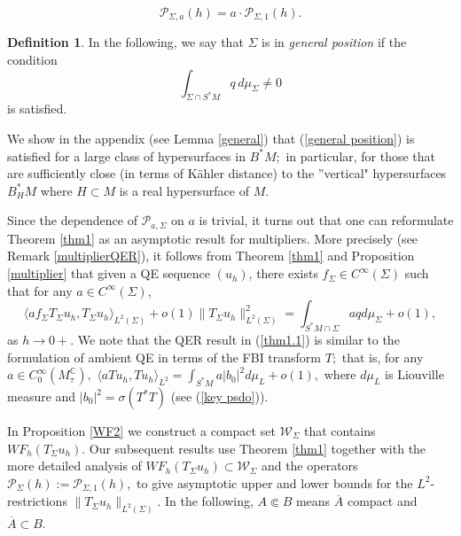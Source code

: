 \documentclass[11pt,reqno]{amsart}
\newcommand{\C}{{\mathbb C}}
\theoremstyle{definition}
\newtheorem{definition}{Definition}
\begin{document}
\begin{equation} \label{basic op}
{\mathcal P}_{\Sigma,a}(h) = a \cdot {\mathcal P}_{\Sigma,1}(h).
\end{equation}

\begin{definition} In the following, we say that $\Sigma$ is in {\em general position} if the condition
\begin{equation} \label{general position}
\int_{\Sigma \cap S^*M} q \, d\mu_{\Sigma} \neq 0
\end{equation}
is satisfied.
\end{definition}

We show in the appendix (see Lemma \ref{general}) that (\ref{general position}) is satisfied for a large class of hypersurfaces in $B^*M;$ in particular, for those that are sufficiently close (in terms of K\"{a}hler distance) to the ''vertical" hypersurfaces $B_H^*M$ where $H \subset M$ is a real hypersurface of $M$.

Since the dependence of ${\mathcal P}_{a,\Sigma}$ on $a$ is trivial, it turns out that one can reformulate Theorem \ref{thm1} as an asymptotic result for multipliers.  More precisely (see Remark \ref{multiplierQER}), it follows from Theorem \ref{thm1} and Proposition \ref{multiplier} that  given a QE sequence $(u_h)$,  there exists  $f_{\Sigma} \in C^{\infty}(\Sigma)$ such that for any $a \in C^{\infty}(\Sigma)$,
\begin{equation} \label{thm1.1}
\langle a  f_{\Sigma} T_{\Sigma} u_h, T_{\Sigma} u_h \rangle_{L^2(\Sigma)}  + o(1) \| T_\Sigma u_h \|^2_{L^2(\Sigma)} = \int_{S^*M \cap \Sigma} a q d\mu_{\Sigma} + o(1),
\end{equation}
as $h \to 0+.$
We note that  the QER result in (\ref{thm1.1}) is  similar to  the formulation of  ambient QE in terms of the FBI transform $T;$  that is, for any  $a \in C^{\infty}_0(M^{\C}_\tau),$
$\langle a Tu_h, Tu_h \rangle_{L^2} = \int_{S^*M} a  |b_0|^2 d\mu_L +o(1),$  where $d\mu_L$ is Liouville measure and $ |b_0|^2= \sigma(T^*T)$ (see (\ref{key psdo})).  



In Proposition \ref{WF2} we construct a compact set $\mathcal{W}_{\Sigma}$ that contains $WF_h(T_{\Sigma}u_h)$. Our subsequent results use Theorem \ref{thm1} together with the more detailed analysis of $WF_h(T_{\Sigma} u_h)\subset\mathcal{W}_{\Sigma}$ and the operators ${\mathcal P}_{\Sigma}(h):= {\mathcal P}_{\Sigma, 1}(h),$ to give asymptotic upper and lower bounds for the $L^2$-restrictions $\|T_{\Sigma} u_h \|_{L^2(\Sigma)}$. In the following, $A\Subset B$ means $\overline{A}$ compact and $\overline A\subset B$.
\end{document}
